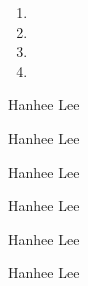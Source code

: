 \documentclass{article}
\begin{document}
\begin{process}
    \begin{enumerate}
        \item 
        \item 
        \item 
        \item 
    \end{enumerate}
\end{process}

\begin{example}
    Hanhee Lee
\end{example}

\begin{definition}
    
\end{definition}

\begin{theorem}
    Hanhee Lee
\end{theorem}

\begin{derivation}
    Hanhee Lee
\end{derivation}

\begin{intuition}
    Hanhee Lee
\end{intuition}

\begin{warning}
    Hanhee Lee
\end{warning}

\begin{terminology}
    Hanhee Lee
\end{terminology}

\end{document}
